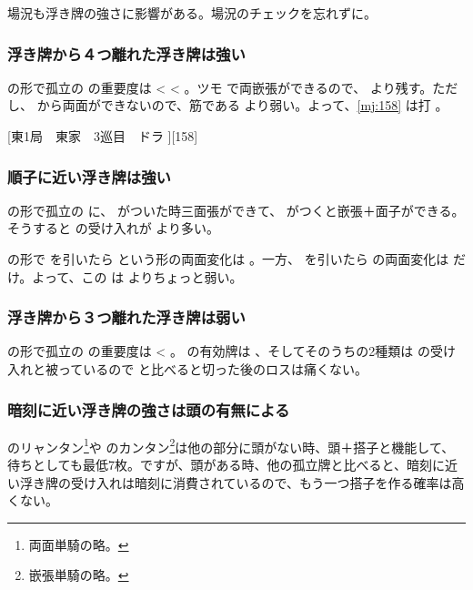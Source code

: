 \documentclass[../nankiru_main.tex]{subfiles}
\begin{document}
場況も浮き牌の強さに影響がある。場況のチェックを忘れずに。


\subsubsection*{浮き牌から４つ離れた浮き牌は強い}

 の形で孤立の  の重要度は  \textless{}  \textless{} 。ツモ  で両嵌張ができるので、 より残す。ただし、 から両面ができないので、筋である  より弱い。よって、\ref{mj:158} は打 。

[東1局　東家　3巡目　ドラ ][158]


\subsubsection*{順子に近い浮き牌は強い}

 の形で孤立の  に、 がついた時三面張ができて、 がつくと嵌張＋面子ができる。そうすると  の受け入れが  より多い\citep{clearrain-floater}。

 の形で  を引いたら  という形の両面変化は 。一方、 を引いたら  の両面変化は  だけ。よって、この  は  よりちょっと弱い\citep{yoteru-floater}。


\subsubsection*{浮き牌から３つ離れた浮き牌は弱い}

 の形で孤立の  の重要度は  \textless{} 。 の有効牌は 、そしてそのうちの2種類は  の受け入れと被っているので  と比べると切った後のロスは痛くない。


\subsubsection*{暗刻に近い浮き牌の強さは頭の有無による}

 のリャンタン\footnote{両面単騎の略。}や  のカンタン\footnote{嵌張単騎の略。}は他の部分に頭がない時、頭＋搭子と機能して、待ちとしても最低7枚。ですが、頭がある時、他の孤立牌と比べると、暗刻に近い浮き牌の受け入れは暗刻に消費されているので、もう一つ搭子を作る確率は高くない。
\end{document}
